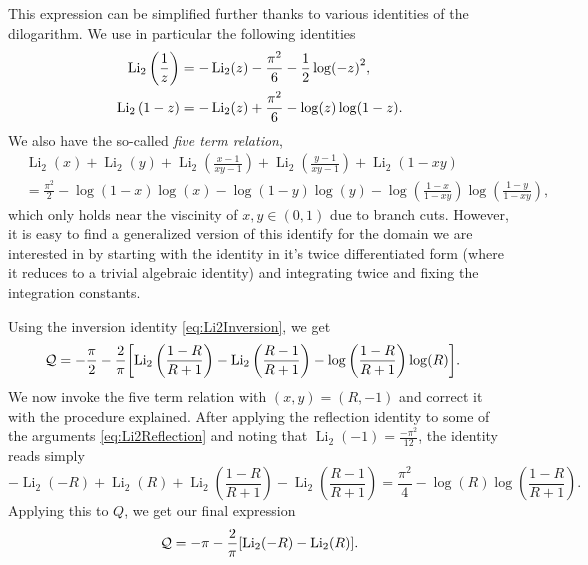 \documentclass[11pt, a4paper]{article}
\newcommand{\Li}{\operatorname{Li}}
\numberwithin{equation}{section}
\begin{document}
This expression can be simplified further thanks to various identities of the dilogarithm. We use in particular the following identities \cite{zagier:dilogarithm}
\begin{align}
  \Li_2\qty(\frac{1}{z}) &= -\Li_2(z) - \frac{\pi^2}{6} - \frac{1}{2}\log(-z)^2, \label{eq:Li2Inversion}\\
  \Li_2\qty(1-z) &= -\Li_2(z) + \frac{\pi^2}{6} - \log(z) \log(1-z). \label{eq:Li2Reflection}
\end{align}
We also have the so-called \textit{five term relation},
\begin{equation}
  \begin{aligned}
    &\Li_2(x)+\Li_2(y)+\Li_2\left(\frac{x-1}{x y-1}\right)+\Li_2\left(\frac{y-1}{x y-1}\right)+\Li_2(1-x y) \\
    &= \frac{\pi ^2}{2} - \log (1-x) \log (x)- \log (1-y) \log (y) -\log \left(\frac{1-x}{1-x y}\right) \log \left(\frac{1-y}{1-x y}\right),
  \end{aligned}
\end{equation}
which only holds near the viscinity of $x, y \in (0, 1)$ due to branch cuts. However, it is easy to find a generalized version of this identify for the domain we are interested in by starting with the identity in it's twice differentiated form (where it reduces to a trivial algebraic identity) and integrating twice and fixing the integration constants.

Using the inversion identity \cref{eq:Li2Inversion}, we get
\begin{equation}
  \begin{aligned}
  \mathcal{Q} &= -\frac{\pi}{2} -\frac{2}{\pi} \qty[\Li_2\left(\frac{1-R}{R+1}\right)- \Li_2\left(\frac{R-1}{R+1}\right) -  \log \left(\frac{1-R}{R+1}\right) \log (R)].
  \end{aligned}
\end{equation}
We now invoke the five term relation with $(x, y) = (R, -1)$ and correct it with the procedure explained. After applying the reflection identity to some of the arguments \cref{eq:Li2Reflection} and noting that $\Li_2(-1) = \frac{-\pi^2}{12}$, the identity reads simply
\begin{equation}
  -\Li_2(-R)+\Li_2(R)+\Li_2\left(\frac{1-R}{R+1}\right)-\Li_2\left(\frac{R-1}{R+1}\right)
  = \frac{\pi ^2}{4}-\log (R) \log \left(\frac{1-R}{R+1}\right).
\end{equation}
Applying this to $Q$, we get our final expression
\begin{equation}
  \mathcal{Q} = - \pi - \frac{2}{\pi} \qty[\Li_2(-R)- \Li_2(R)].
\end{equation}
\end{document}
